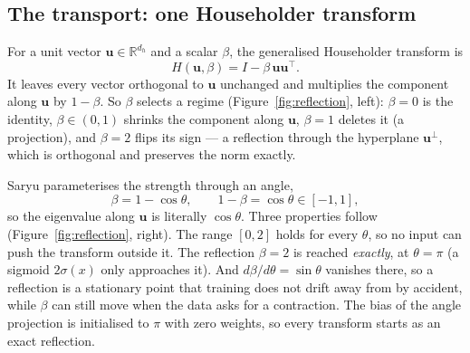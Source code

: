\documentclass[10pt]{article}
\newcommand{\R}{\mathbb{R}}
\newcommand{\bu}{\mathbf{u}}
\begin{document}
\subsection{The transport: one Householder transform}

For a unit vector $\bu\in\R^{d_h}$ and a scalar $\beta$, the generalised Householder transform is
\begin{equation}
  H(\bu,\beta) = I - \beta\,\bu\bu^\top .
\end{equation}
It leaves every vector orthogonal to $\bu$ unchanged and multiplies the component along $\bu$ by
$1-\beta$. So $\beta$ selects a regime (Figure~\ref{fig:reflection}, left):
$\beta=0$ is the identity, $\beta\in(0,1)$ shrinks the component along $\bu$, $\beta=1$ deletes it
(a projection), and $\beta=2$ flips its sign --- a reflection through the hyperplane $\bu^\perp$, which is
orthogonal and preserves the norm exactly.

Saryu parameterises the strength through an angle,
\begin{equation}
  \beta = 1-\cos\theta, \qquad 1-\beta = \cos\theta \in[-1,1],
  \label{eq:beta}
\end{equation}
so the eigenvalue along $\bu$ is literally $\cos\theta$. Three properties follow
(Figure~\ref{fig:reflection}, right). The range $[0,2]$ holds for every $\theta$, so no input can push
the transform outside it. The reflection $\beta=2$ is reached \emph{exactly}, at $\theta=\pi$ (a
sigmoid $2\sigma(x)$ only approaches it). And $d\beta/d\theta=\sin\theta$ vanishes there, so a reflection
is a stationary point that training does not drift away from by accident, while $\beta$ can still move
when the data asks for a contraction. The bias of the angle projection is initialised to $\pi$ with
zero weights, so every transform starts as an exact reflection.
\end{document}

